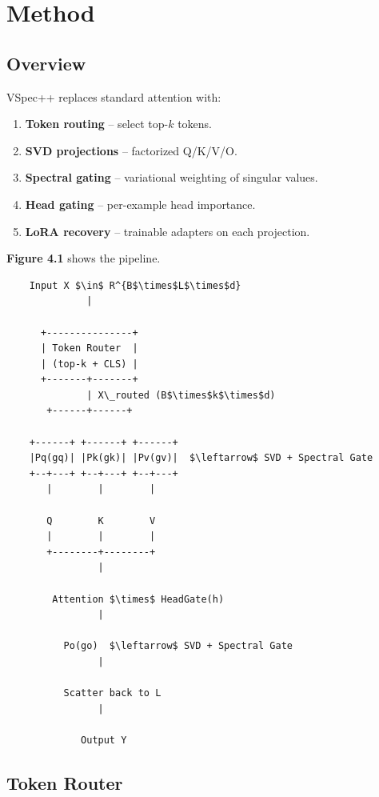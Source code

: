 \section{Method}

\subsection{Overview}

VSpec++ replaces standard attention with:

\begin{enumerate}
\item \textbf{Token routing} -- select top-$k$ tokens.
\item \textbf{SVD projections} -- factorized Q/K/V/O.
\item \textbf{Spectral gating} -- variational weighting of singular values.
\item \textbf{Head gating} -- per-example head importance.
\item \textbf{LoRA recovery} -- trainable adapters on each projection.

\end{enumerate}
\textbf{Figure 4.1} shows the pipeline.

\begin{lstlisting}
    Input X $\in$ R^{B$\times$L$\times$d}
              |
               
      +---------------+
      | Token Router  |
      | (top-k + CLS) |
      +-------+-------+
              | X\_routed (B$\times$k$\times$d)
       +------+------+
                      
    +------+ +------+ +------+
    |Pq(gq)| |Pk(gk)| |Pv(gv)|  $\leftarrow$ SVD + Spectral Gate
    +--+---+ +--+---+ +--+---+
       |        |        |
                          
       Q        K        V
       |        |        |
       +--------+--------+
                |
                 
        Attention $\times$ HeadGate(h)
                |
                 
          Po(go)  $\leftarrow$ SVD + Spectral Gate
                |
                 
          Scatter back to L
                |
                 
             Output Y
\end{lstlisting}

\subsection{Token Router}


